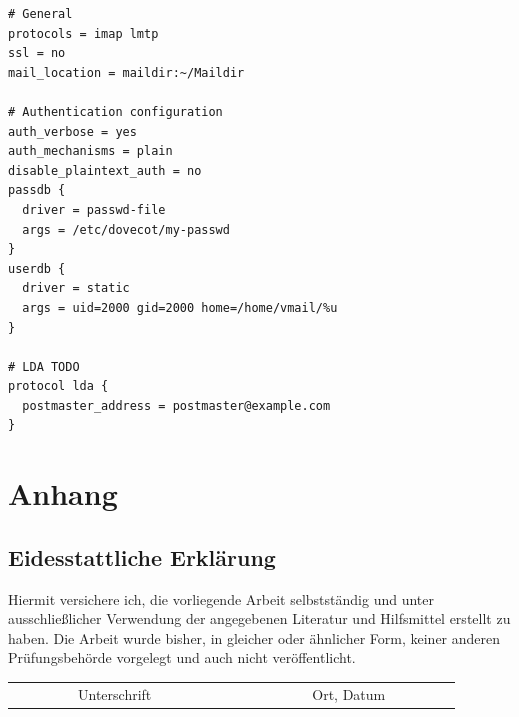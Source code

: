 \documentclass[a4paper,11pt,singlespacing]{article}
\begin{document}
\begin{lstlisting}[label={lst:DovecotKonfiguration},caption={Dovecot Konfiguration}]
# General
protocols = imap lmtp
ssl = no
mail_location = maildir:~/Maildir

# Authentication configuration
auth_verbose = yes
auth_mechanisms = plain
disable_plaintext_auth = no
passdb {
  driver = passwd-file
  args = /etc/dovecot/my-passwd
}
userdb {
  driver = static
  args = uid=2000 gid=2000 home=/home/vmail/%u
}

# LDA TODO
protocol lda {
  postmaster_address = postmaster@example.com
}
\end{lstlisting}

\newpage


\section*{Anhang}\label{Anhang}
\newpage


\begin{newpage}
\vspace*{\fill}
\section*{Eidesstattliche Erklärung}\label{sec:Eidesstattliche Erklärung}
	Hiermit versichere ich, die vorliegende Arbeit selbstständig und unter ausschlie{\ss}licher Verwendung der angegebenen Literatur und Hilfsmittel erstellt zu haben. Die Arbeit wurde bisher, in gleicher oder ähnlicher Form, keiner anderen Prüfungsbehörde vorgelegt und auch nicht veröffentlicht.\\

\vspace{3cm}
\begin{tabular*}{\textwidth}{c@{\extracolsep\fill}cc}
\cline{1-1}
\cline{3-3}
\\
\ \ \ \ \ \ \ \ \ Unterschrift\ \ \ \ \ \ \ \ \ \ & & \ \ \ \ \ \ \ \ \ Ort, Datum\ \ \ \ \ \ \ \ \ \\
\end{tabular*}
\end{newpage}
\end{document}
